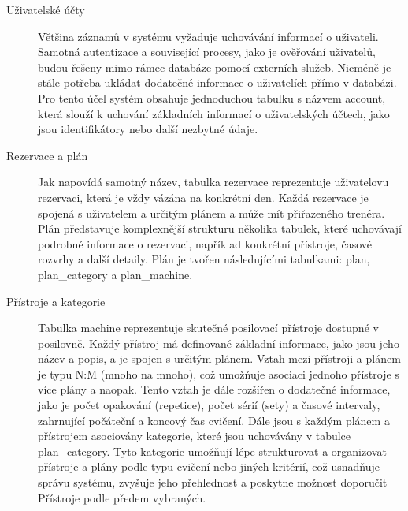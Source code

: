 \begin{description}
    \item[Uživatelské účty] Většina záznamů v systému vyžaduje uchovávání informací o uživateli. Samotná autentizace a související procesy, jako je ověřování uživatelů, budou řešeny mimo rámec databáze pomocí externích služeb. Nicméně je stále potřeba ukládat dodatečné informace o uživatelích přímo v databázi. Pro tento účel systém obsahuje jednoduchou tabulku s názvem account, která slouží k uchování základních informací o uživatelských účtech, jako jsou identifikátory nebo další nezbytné údaje.
    \item[Rezervace a plán] Jak napovídá samotný název, tabulka rezervace reprezentuje uživatelovu rezervaci, která je vždy vázána na konkrétní den. Každá rezervace je spojená s uživatelem a určitým plánem a může mít přiřazeného trenéra. Plán představuje komplexnější strukturu několika tabulek, které uchovávají podrobné informace o rezervaci, například konkrétní přístroje, časové rozvrhy a další detaily. Plán je tvořen následujícími tabulkami: plan, plan\_category a plan\_machine.
    \item[Přístroje a kategorie] Tabulka machine reprezentuje skutečné posilovací přístroje dostupné v posilovně. Každý přístroj má definované základní informace, jako jsou jeho název a popis, a je spojen s určitým plánem. Vztah mezi přístroji a plánem je typu N:M (mnoho na mnoho), což umožňuje asociaci jednoho přístroje s více plány a naopak. Tento vztah je dále rozšířen o dodatečné informace, jako je počet opakování (repetice), počet sérií (sety) a časové intervaly, zahrnující počáteční a koncový čas cvičení. Dále jsou s každým plánem a přístrojem asociovány kategorie, které jsou uchovávány v tabulce plan\_category. Tyto kategorie umožňují lépe strukturovat a organizovat přístroje a plány podle typu cvičení nebo jiných kritérií, což usnadňuje správu systému, zvyšuje jeho přehlednost a poskytne možnost doporučit Přístroje podle předem vybraných.
\end{description}
